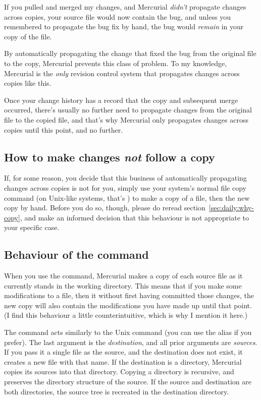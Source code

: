If you pulled and merged my changes, and Mercurial \emph{didn't}
propagate changes across copies, your source file would now contain
the bug, and unless you remembered to propagate the bug fix by hand,
the bug would \emph{remain} in your copy of the file.

By automatically propagating the change that fixed the bug from the
original file to the copy, Mercurial prevents this class of problem.
To my knowledge, Mercurial is the \emph{only} revision control system
that propagates changes across copies like this.

Once your change history has a record that the copy and subsequent
merge occurred, there's usually no further need to propagate changes
from the original file to the copied file, and that's why Mercurial
only propagates changes across copies until this point, and no
further.

\subsection{How to make changes \emph{not} follow a copy}

If, for some reason, you decide that this business of automatically
propagating changes across copies is not for you, simply use your
system's normal file copy command (on Unix-like systems, that's
) to make a copy of a file, then  the new copy
by hand.  Before you do so, though, please do reread
section~\ref{sec:daily:why-copy}, and make an informed decision that
this behaviour is not appropriate to your specific case.

\subsection{Behaviour of the  command}

When you use the  command, Mercurial makes a copy of each
source file as it currently stands in the working directory.  This
means that if you make some modifications to a file, then 
it without first having committed those changes, the new copy will
also contain the modifications you have made up until that point.  (I
find this behaviour a little counterintuitive, which is why I mention
it here.)

The  command acts similarly to the Unix 
command (you can use the  alias if you prefer).  The last
argument is the \emph{destination}, and all prior arguments are
\emph{sources}.  If you pass it a single file as the source, and the
destination does not exist, it creates a new file with that name.
If the destination is a directory, Mercurial copies its sources into
that directory.
Copying a directory is recursive, and preserves the directory
structure of the source.
If the source and destination are both directories, the source tree is
recreated in the destination directory.

